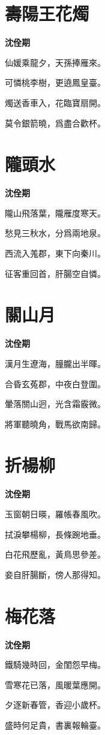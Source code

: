 \documentclass[12pt,a4paper]{ctexbook}
\begin{document}
\section{壽陽王花燭}
\textbf{沈佺期}\par\vspace{0.5em}
仙媛乘龍夕，天孫捧雁來。\par
可憐桃李樹，更遶鳳皇臺。\par
燭送香車入，花臨寶扇開。\par
莫令銀箭曉，爲盡合歡杯。\par

\section{隴頭水}
\textbf{沈佺期}\par\vspace{0.5em}
隴山飛落葉，隴雁度寒天。\par
愁見三秋水，分爲兩地泉。\par
西流入羗郡，東下向秦川。\par
征客重回首，肝腸空自憐。\par

\section{關山月}
\textbf{沈佺期}\par\vspace{0.5em}
漢月生遼海，朣朧出半暉。\par
合昏玄菟郡，中夜白登圍。\par
暈落關山迥，光含霜霰微。\par
將軍聽曉角，戰馬欲南歸。\par

\section{折楊柳}
\textbf{沈佺期}\par\vspace{0.5em}
玉窗朝日暎，羅帳春風吹。\par
拭淚攀楊柳，長條踠地垂。\par
白花飛歷亂，黃鳥思參差。\par
妾自肝腸斷，傍人那得知。\par

\section{梅花落}
\textbf{沈佺期}\par\vspace{0.5em}
鐵騎幾時回，金閨怨早梅。\par
雪寒花已落，風暖葉應開。\par
夕逐新春管，香迎小歲杯。\par
盛時何足貴，書裏報輪臺。\par
\end{document}
